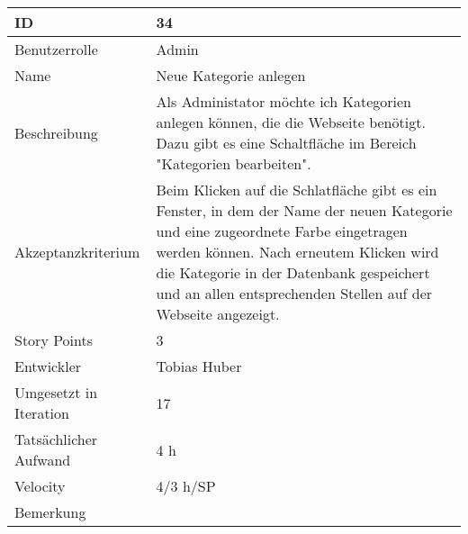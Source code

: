 \begin{tabularx}{\textwidth}{|p{}|X|}
	\hline
	ID & 34\\
	\hline
	Benutzerrolle & Admin\\
	\hline
	Name & Neue Kategorie anlegen\\
	\hline
	Beschreibung & Als Administator möchte ich Kategorien anlegen können, die die Webseite benötigt. Dazu gibt es eine Schaltfläche im Bereich "Kategorien bearbeiten".\\
	\hline
	Akzeptanzkriterium & Beim Klicken auf die Schlatfläche gibt es ein Fenster, in dem der Name der neuen Kategorie und eine zugeordnete Farbe eingetragen werden können. Nach erneutem Klicken wird die Kategorie in der Datenbank gespeichert und an allen entsprechenden Stellen auf der Webseite angezeigt.\\
	\hline
	Story Points & 3 \\
	\hline
	Entwickler & Tobias Huber\\
	\hline
	Umgesetzt in Iteration & 17\\
	\hline
	Tatsächlicher Aufwand & 4 h\\
	\hline
	Velocity & 4/3 h/SP\\
	\hline
	Bemerkung & \\
	\hline
\end{tabularx}
\vspace{20pt}
